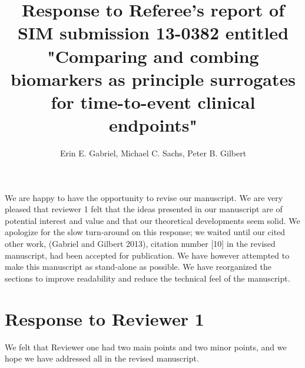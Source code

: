 \documentclass[11pt]{article} %
\title{Response to Referee’s report of SIM submission 13-0382 entitled "Comparing and
combing biomarkers as principle surrogates for time-to-event clinical
endpoints"}
\author{Erin E. Gabriel, Michael C. Sachs, Peter B. Gilbert}
\begin{document}
\maketitle
We are happy to have the opportunity to revise our manuscript. We are very pleased that reviewer 1 felt that the ideas presented in our manuscript are of potential interest and value and that our theoretical developments seem solid. We apologize for the slow turn-around on this response; we waited until our cited other work, (Gabriel and Gilbert 2013), citation number [10] in the revised manuscript, had been accepted for publication. We have however attempted to make this manuscript as stand-alone as possible. We have reorganized the sections to improve readability and reduce the technical feel of the manuscript. 

\section{Response to Reviewer 1}
We felt that Reviewer one had two main points and two minor points, and we hope we have addressed all in the revised manuscript.\\
\end{document}
